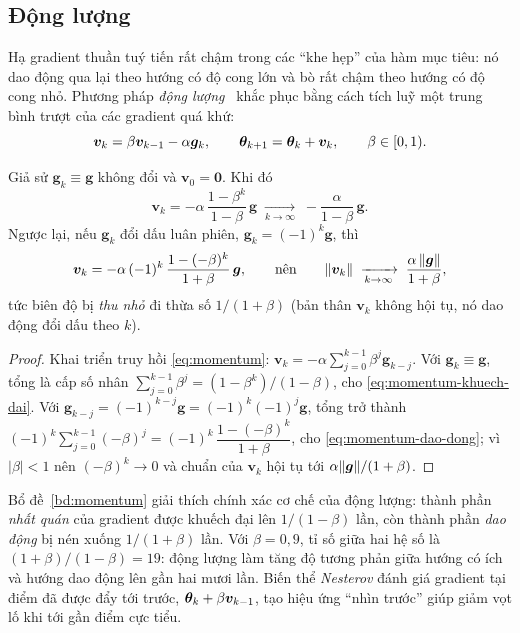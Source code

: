 \subsection{Động lượng}
\label{subsec:momentum}
 
Hạ gradient thuần tuý tiến rất chậm trong các ``khe hẹp'' của hàm mục tiêu: nó
dao động qua lại theo hướng có độ cong lớn và bò rất chậm theo hướng có độ cong
nhỏ. Phương pháp \emph{động lượng}~\cite{goodfellow2016} khắc phục bằng cách tích
luỹ một trung bình trượt của các gradient quá khứ:
\begin{equation}
\bm{v}_k = \beta \bm{v}_{k-1} - \alpha \bm{g}_k,
\qquad
\bm{\theta}_{k+1} = \bm{\theta}_k + \bm{v}_k,
\qquad \beta \in [0,1).
\label{eq:momentum}
\end{equation}
 
\begin{bode}
\label{bd:momentum}
Giả sử $\bm{g}_k \equiv \bm{g}$ không đổi và $\bm{v}_0 = \bm{0}$. Khi đó
\begin{equation}
\bm{v}_k = -\alpha\,\frac{1-\beta^{k}}{1-\beta}\,\bm{g}
\;\xrightarrow[k\to\infty]{}\;
-\frac{\alpha}{1-\beta}\,\bm{g}.
\label{eq:momentum-khuech-dai}
\end{equation}
Ngược lại, nếu $\bm{g}_k$ đổi dấu luân phiên, $\bm{g}_k = (-1)^k\bm{g}$, thì
\begin{equation}
\bm{v}_k = -\alpha\,(-1)^{k}\,\frac{1-(-\beta)^{k}}{1+\beta}\,\bm{g},
\qquad\text{nên}\qquad
\lVert\bm{v}_k\rVert \;\xrightarrow[k\to\infty]{}\;
  \frac{\alpha\,\lVert\bm{g}\rVert}{1+\beta},
\label{eq:momentum-dao-dong}
\end{equation}
tức biên độ bị \emph{thu nhỏ} đi thừa số $1/(1+\beta)$ (bản thân $\bm{v}_k$ không
hội tụ, nó dao động đổi dấu theo $k$).
\end{bode}
 
\begin{proof}
Khai triển truy hồi \eqref{eq:momentum}:
$\bm{v}_k = -\alpha\sum_{j=0}^{k-1}\beta^{j}\bm{g}_{k-j}$. Với $\bm{g}_k \equiv
\bm{g}$, tổng là cấp số nhân $\sum_{j=0}^{k-1}\beta^j = (1-\beta^k)/(1-\beta)$,
cho \eqref{eq:momentum-khuech-dai}. Với $\bm{g}_{k-j} = (-1)^{k-j}\bm{g}
= (-1)^{k}(-1)^{j}\bm{g}$, tổng trở thành
$(-1)^k\sum_{j=0}^{k-1}(-\beta)^{j} = (-1)^k\,\dfrac{1-(-\beta)^{k}}{1+\beta}$,
cho \eqref{eq:momentum-dao-dong}; vì $|\beta| < 1$ nên $(-\beta)^k \to 0$ và
chuẩn của $\bm{v}_k$ hội tụ tới $\alpha\lVert\bm{g}\rVert/(1+\beta)$.
\end{proof}
 
Bổ đề~\ref{bd:momentum} giải thích chính xác cơ chế của động lượng: thành phần
\emph{nhất quán} của gradient được khuếch đại lên $1/(1-\beta)$ lần, còn thành
phần \emph{dao động} bị nén xuống $1/(1+\beta)$ lần. Với $\beta = 0{,}9$, tỉ số
giữa hai hệ số là $(1+\beta)/(1-\beta) = 19$: động lượng làm tăng độ tương phản
giữa hướng có ích và hướng dao động lên gần hai mươi lần. Biến thể
\emph{Nesterov} đánh giá gradient tại điểm đã được đẩy tới trước,
$\bm{\theta}_k + \beta\bm{v}_{k-1}$, tạo hiệu ứng ``nhìn trước'' giúp giảm vọt lố khi
tới gần điểm cực tiểu.
 
